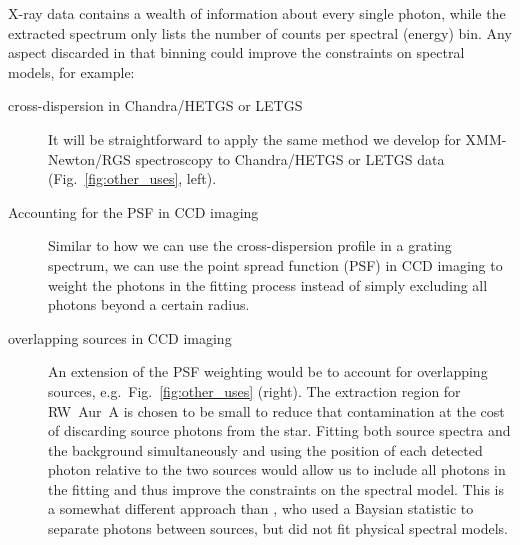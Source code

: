 \documentclass[fleqn,12pt,onecolumn]{SelfArx} %
\begin{document}
X-ray data contains a wealth of information about every single photon, while the extracted spectrum only lists the number of counts per spectral (energy) bin. Any aspect discarded in that binning could improve the constraints on spectral models, for example:
\begin{description}
    \item[cross-dispersion in Chandra/HETGS or LETGS] It will be straightforward to apply the same method we develop for XMM-Newton/RGS spectroscopy to Chandra/HETGS or LETGS data (Fig.~\ref{fig:other_uses}, left). %
    \item[Accounting for the PSF in CCD imaging] Similar to how we can use the cross-dispersion profile in a grating spectrum, we can use the point spread function (PSF) in CCD imaging to weight the photons in the fitting process instead of simply excluding all photons beyond a certain radius. %
    \item[overlapping sources in CCD imaging] An extension of the PSF weighting would be to account for overlapping sources, e.g.\ Fig.~\ref{fig:other_uses} (right). The extraction region for RW~Aur~A is chosen to be small to reduce that contamination at the cost of discarding source photons from the star. Fitting both source spectra and the background simultaneously and using the position of each detected photon relative to the two sources would allow us to include all photons in the fitting and thus improve the constraints on the spectral model. This is a somewhat different approach than \cite{2015ApJ...808..137J}, who used a Baysian statistic to separate photons between sources, but did not fit physical spectral models.

\end{description}
\end{document}
